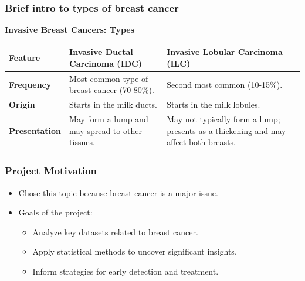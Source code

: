 \begin{frame}
    \frametitle{Brief intro to types of breast cancer}

    \textbf{Invasive Breast Cancers: Types}
    \begin{center}
        \begin{tabular}{ | >{\bfseries}l | >{\raggedright\arraybackslash}p{4cm} | >{\raggedright\arraybackslash}p{4cm} | }
            \hline
            \textbf{Feature}      & \textbf{Invasive Ductal Carcinoma (IDC)}         & \textbf{Invasive Lobular Carcinoma (ILC)}                                            \\
            \hline
            \textbf{Frequency}    & Most common type of breast cancer (70-80\%).     & Second most common (10-15\%).                                                        \\
            \hline
            \textbf{Origin}       & Starts in the milk ducts.                        & Starts in the milk lobules.                                                          \\
            \hline
            \textbf{Presentation} & May form a lump and may spread to other tissues. & May not typically form a lump; presents as a thickening and may affect both breasts. \\
            \hline
        \end{tabular}
    \end{center}
\end{frame}

\begin{frame}
    \frametitle{Project Motivation}
    {\LARGE
        \begin{itemize}
            \item Chose this topic because breast cancer is a major issue.
            \item Goals of the project:
                  \begin{itemize}
                      \item Analyze key datasets related to breast cancer.
                      \item Apply statistical methods to uncover significant insights.
                      \item Inform strategies for early detection and treatment.
                  \end{itemize}
        \end{itemize}
    }
\end{frame}

